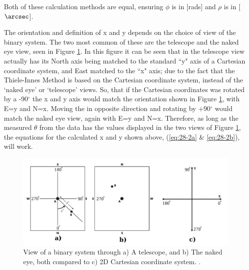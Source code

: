 \documentclass[12pt,preprint]{aastex}
\begin{document}
Both of these calculation methods are equal, ensuring $\phi$ is in [rads] and $\rho$ is in [$\arcsec$].

The orientation and definition of x and y depends on the choice of view of the binary system.  The two most common of these are the telescope and the naked eye view, seen in Figure \ref{fig:4}.  In this figure it can be seen that in the telescope view actually has its North axis being matched to the standard ``y" axis of a Cartesian coordinate system, and East matched to the ``x" axis; due to the fact that the Thiele-Innes Method is based on the Cartesian coordinate system, instead of the `naked eye' or `telescope' views.  So, that if the Cartesian coordinates was rotated by a -90$^\circ$ the x and y axis would match the orientation shown in Figure \ref{fig:4}, with E=y and N=x.  Moving the in opposite direction and rotating by +90$^\circ$ would match the naked eye view, again with E=y and N=x.  Therefore, as long as the measured $\theta$ from the data has the values displayed in the two views of Figure \ref{fig:4}, the equations for the calculated x and y shown above, (\ref{eq:28-2a} \& \ref{eq:28-2b}), will work.


\begin{figure}[ht]
\begin{center}
\includegraphics[scale=0.9]{Argyle-oribit-plots1-cropped-AND-cartesianCoordsPlot.jpg}
\caption[View of a Binary System]{ View of a binary system through a) A telescope, and b) The naked eye, both compared to c) 2D Cartesian coordinate system. \citet{Argyle}. }
\label{fig:4}
\end{center}
\end{figure}

\end{document}
